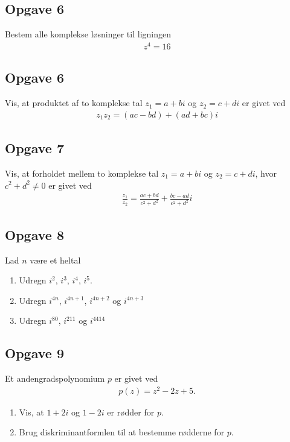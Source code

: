 \subsection*{Opgave 6}
Bestem alle komplekse løsninger til ligningen 
\begin{align*}
	z^4 = 16
\end{align*}

\subsection*{Opgave 6}
Vis, at produktet af to komplekse tal $z_1 = a + bi$ og $z_2 = c + di$ er givet ved
\begin{align*}
	z_1z_2 = (ac - bd) + (ad + bc)i
\end{align*} 

\subsection*{Opgave 7}
Vis, at forholdet mellem to komplekse tal $z_1 = a + bi$ og $z_2 = c + di$, hvor $c^2 + d^2 \neq 0$ er givet ved
\begin{align*}
	\frac{z_1}{z_2} = \frac{ac + bd}{c^2 + d^2} + \frac{bc - ad}{c^2+ d^2}i
\end{align*}

\subsection*{Opgave 8}
Lad $n$ være et heltal
\begin{enumerate}[label=\roman*)]
	\item Udregn $i^2$, $i^3$, $i^4$, $i^5$. 
	\item Udregn $i^{4n}$, $i^{4n + 1}$, $i^{4n + 2}$ og $i^{4n + 3}$ 
	\item Udregn $i^{80}$, $i^{211}$ og $i^{4414}$ 
\end{enumerate}

\subsection*{Opgave 9}
Et andengradspolynomium $p$ er givet ved
\begin{align*}
	p(z) = z^2 -2z + 5.
\end{align*}
\begin{enumerate}[label=\roman*)]
	\item Vis, at $1 + 2i$ og $1 - 2i$ er rødder for $p$.
	\item Brug diskriminantformlen til at bestemme rødderne for $p$. 
\end{enumerate}